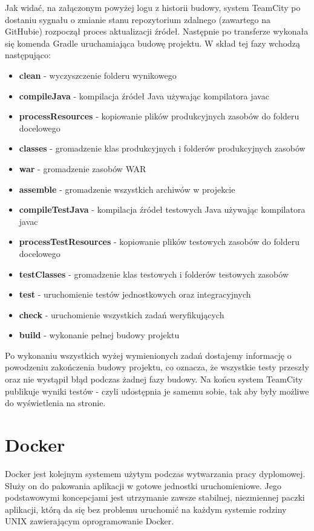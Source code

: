 Jak widać, na załączonym powyżej logu z historii budowy, system TeamCity po dostaniu sygnału o zmianie stanu repozytorium zdalnego (zawartego na GitHubie) rozpoczął proces aktualizacji źródeł. Następnie po transferze wykonała się komenda Gradle uruchamiająca budowę projektu. W skład tej fazy wchodzą następująco:
\begin{itemize}
	\item \textbf{clean} - wyczyszczenie folderu wynikowego
	\item \textbf{compileJava} - kompilacja źródeł Java używając kompilatora javac
	\item \textbf{processResources} - kopiowanie plików produkcyjnych zasobów do folderu docelowego
	\item \textbf{classes} - gromadzenie klas produkcyjnych i folderów produkcyjnych zasobów
	\item \textbf{war} - gromadzenie zasobów WAR
	\item \textbf{assemble} - gromadzenie wszystkich archiwów w projekcie
	\item \textbf{compileTestJava} - kompilacja źródeł testowych Java używając kompilatora javac
	\item \textbf{processTestResources} - kopiowanie plików testowych zasobów do folderu docelowego
	\item \textbf{testClasses} - gromadzenie klas testowych i folderów testowych zasobów
	\item \textbf{test} - uruchomienie testów jednostkowych oraz integracyjnych
	\item \textbf{check} - uruchomienie wszystkich zadań weryfikujących
	\item \textbf{build} - wykonanie pełnej budowy projektu
\end{itemize}

Po wykonaniu wszystkich wyżej wymienionych zadań dostajemy informację o powodzeniu zakończenia budowy projektu, co oznacza, że wszystkie testy przeszły oraz nie wystąpił błąd podczas żadnej fazy budowy. Na końcu system TeamCity publikuje wyniki testów - czyli udostępnia je samemu sobie, tak aby były możliwe do wyświetlenia na stronie.

\section{Docker}
Docker jest kolejnym systemem użytym podczas wytwarzania pracy dyplomowej. Służy on do pakowania aplikacji w gotowe jednostki uruchomieniowe. Jego podstawowymi koncepcjami jest utrzymanie zawsze stabilnej, niezmiennej paczki aplikacji, którą da się bez problemu uruchomić na każdym systemie rodziny UNIX zawierającym oprogramowanie Docker.

